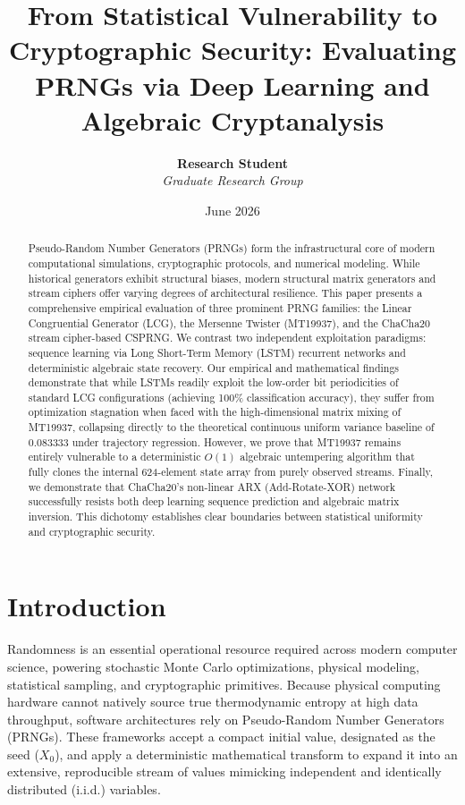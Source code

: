 \documentclass[twocolumn,10pt]{article}
\title{\textbf{From Statistical Vulnerability to Cryptographic Security: Evaluating PRNGs via Deep Learning and Algebraic Cryptanalysis}}
\author{\textbf{Research Student} \\ \textit{Graduate Research Group}}
\date{\small June 2026}
\begin{document}
\maketitle

\begin{abstract}
Pseudo-Random Number Generators (PRNGs) form the infrastructural core of modern computational simulations, cryptographic protocols, and numerical modeling. While historical generators exhibit structural biases, modern structural matrix generators and stream ciphers offer varying degrees of architectural resilience. This paper presents a comprehensive empirical evaluation of three prominent PRNG families: the Linear Congruential Generator (LCG), the Mersenne Twister (MT19937), and the ChaCha20 stream cipher-based CSPRNG. We contrast two independent exploitation paradigms: sequence learning via Long Short-Term Memory (LSTM) recurrent networks and deterministic algebraic state recovery. Our empirical and mathematical findings demonstrate that while LSTMs readily exploit the low-order bit periodicities of standard LCG configurations (achieving 100\% classification accuracy), they suffer from optimization stagnation when faced with the high-dimensional matrix mixing of MT19937, collapsing directly to the theoretical continuous uniform variance baseline of $0.083333$ under trajectory regression. However, we prove that MT19937 remains entirely vulnerable to a deterministic $O(1)$ algebraic untempering algorithm that fully clones the internal 624-element state array from purely observed streams. Finally, we demonstrate that ChaCha20's non-linear ARX (Add-Rotate-XOR) network successfully resists both deep learning sequence prediction and algebraic matrix inversion. This dichotomy establishes clear boundaries between statistical uniformity and cryptographic security.
\end{abstract}

\section{Introduction}
Randomness is an essential operational resource required across modern computer science, powering stochastic Monte Carlo optimizations, physical modeling, statistical sampling, and cryptographic primitives. Because physical computing hardware cannot natively source true thermodynamic entropy at high data throughput, software architectures rely on Pseudo-Random Number Generators (PRNGs). These frameworks accept a compact initial value, designated as the seed ($X_0$), and apply a deterministic mathematical transform to expand it into an extensive, reproducible stream of values mimicking independent and identically distributed (i.i.d.) variables.
\end{document}
